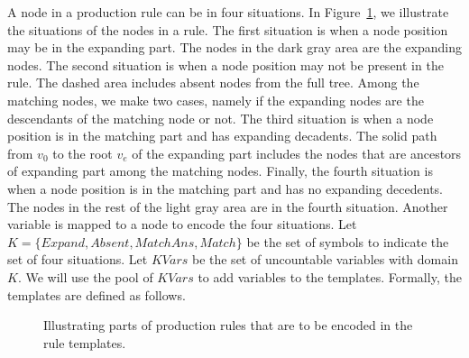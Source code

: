 A node in a production rule can be in four situations.
In Figure~\ref{fig:rule-parts}, we illustrate the situations of the nodes in a rule.
The first situation is when a node position may be in the expanding part.
The nodes in the dark gray area are the expanding nodes.
The second situation is when a node position may not be present in the rule.
The dashed area includes absent nodes
from the full tree.
Among the matching nodes, we make two cases, namely if the expanding
nodes are the descendants of the matching node or not. 
The third situation is when a node position is in the matching part
and has expanding decadents.
The solid path from $v_0$ to the root $v_e$ of the expanding part includes
the nodes that are ancestors of expanding part among the matching nodes.
Finally, the fourth situation is when a node position is in the matching part and
has no expanding decedents.
The nodes in the rest of the light gray area are in the fourth situation.
Another variable is mapped to a node to encode the four situations.
Let $K =\{Expand,Absent,MatchAns,Match\}$ be the set of symbols to
indicate the set of four situations.
Let $KVars$ be the set of uncountable variables with domain $K$. 
We will use the pool of $KVars$ to add variables to the templates.
Formally, the templates are defined as follows.

\begin{figure}[t]
        \center

  \caption{Illustrating parts of production rules that are to be encoded in the rule templates.}
  \label{fig:rule-parts}
\end{figure}


